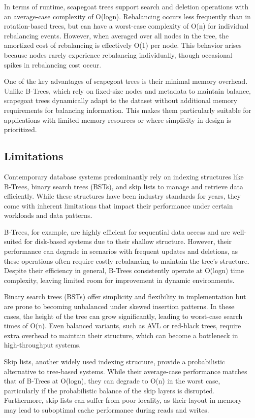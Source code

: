 \documentclass[sigconf]{acmart}
\begin{document}
In terms of runtime, scapegoat trees support search and deletion operations with an average-case complexity of O(logn). Rebalancing occurs less frequently than in rotation-based trees, but can have a worst-case complexity of O(n) for individual rebalancing events. However, when averaged over all nodes in the tree, the amortized cost of rebalancing is effectively O(1) per node. This behavior arises because nodes rarely experience rebalancing individually, though occasional spikes in rebalancing cost occur.

One of the key advantages of scapegoat trees is their minimal memory overhead. Unlike B-Trees, which rely on fixed-size nodes and metadata to maintain balance, scapegoat trees dynamically adapt to the dataset without additional memory requirements for balancing information. This makes them particularly suitable for applications with limited memory resources or where simplicity in design is prioritized. 

\subsection{Limitations}
Contemporary database systems predominantly rely on indexing structures like B-Trees, binary search trees (BSTs), and skip lists to manage and retrieve data efficiently. While these structures have been industry standards for years, they come with inherent limitations that impact their performance under certain workloads and data patterns.

B-Trees, for example, are highly efficient for sequential data access and are well-suited for disk-based systems due to their shallow structure. However, their performance can degrade in scenarios with frequent updates and deletions, as these operations often require costly rebalancing to maintain the tree's structure. Despite their efficiency in general, B-Trees consistently operate at O(logn) time complexity, leaving limited room for improvement in dynamic environments.

Binary search trees (BSTs) offer simplicity and flexibility in implementation but are prone to becoming unbalanced under skewed insertion patterns. In these cases, the height of the tree can grow significantly, leading to worst-case search times of O(n). Even balanced variants, such as AVL or red-black trees, require extra overhead to maintain their structure, which can become a bottleneck in high-throughput systems.

Skip lists, another widely used indexing structure, provide a probabilistic alternative to tree-based systems. While their average-case performance matches that of B-Trees at O(logn), they can degrade to O(n) in the worst case, particularly if the probabilistic balance of the skip layers is disrupted. Furthermore, skip lists can suffer from poor locality, as their layout in memory may lead to suboptimal cache performance during reads and writes.
\end{document}
